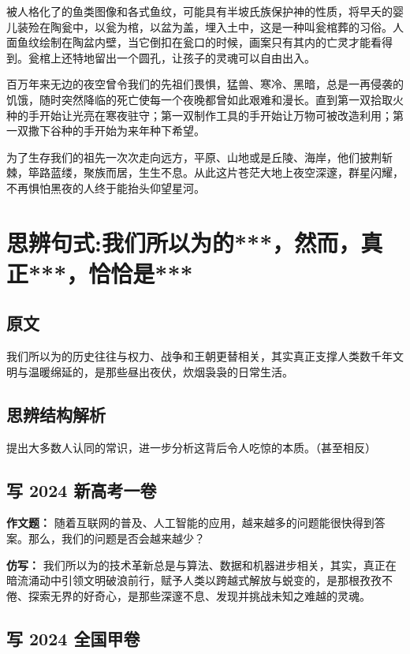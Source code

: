 被人格化了的鱼类图像和各式鱼纹，可能具有半坡氏族保护神的性质，将早夭的婴儿装殓在陶瓮中，以瓮为棺，以盆为盖，埋入土中，这是一种叫瓮棺葬的习俗。人面鱼纹绘制在陶盆内壁，当它倒扣在瓮口的时候，画案只有其内的亡灵才能看得到。瓮棺上还特地留出一个圆孔，让孩子的灵魂可以自由出入。

百万年来无边的夜空曾令我们的先祖们畏惧，猛兽、寒冷、黑暗，总是一再侵袭的饥饿，随时突然降临的死亡使每一个夜晚都曾如此艰难和漫长。直到第一双拾取火种的手开始让光亮在寒夜驻守；第一双制作工具的手开始让万物可被改造利用；第一双撒下谷种的手开始为来年种下希望。

为了生存我们的祖先一次次走向远方，平原、山地或是丘陵、海岸，他们披荆斩棘，筚路蓝缕，聚族而居，生生不息。从此这片苍茫大地上夜空深邃，群星闪耀，不再惧怕黑夜的人终于能抬头仰望星河。


\section{思辨句式:我们所以为的***，然而，真正***，恰恰是***}

\subsection{原文}

我们所以为的历史往往与权力、战争和王朝更替相关，其实真正支撑人类数千年文明与温暖绵延的，是那些昼出夜伏，炊烟袅袅的日常生活。

\subsection{思辨结构解析}

提出大多数人认同的常识，进一步分析这背后令人吃惊的本质。（甚至相反）

\subsection{写 2024 新高考一卷}

\textbf{作文题：} 随着互联网的普及、人工智能的应用，越来越多的问题能很快得到答案。那么，我们的问题是否会越来越少？

\textbf{仿写：} 我们所以为的技术革新总是与算法、数据和机器进步相关，其实，真正在暗流涌动中引领文明破浪前行，赋予人类以跨越式解放与蜕变的，是那根孜孜不倦、探索无界的好奇心，是那些深邃不息、发现并挑战未知之难越的灵魂。


\subsection{写 2024 全国甲卷}

